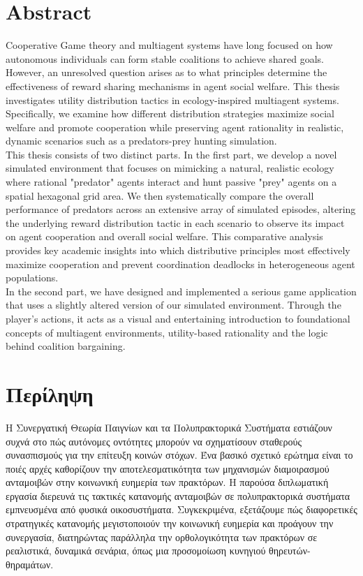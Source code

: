 \documentclass[12pt,a4paper]{report}
\begin{document}
	\chapter*{Abstract}
	
	Cooperative Game theory and multiagent systems have long focused on how autonomous individuals can form stable coalitions to achieve shared goals. However, an unresolved question arises as to what principles determine the effectiveness of reward sharing mechanisms in agent social welfare. This thesis investigates utility distribution tactics in ecology-inspired multiagent systems. Specifically, we examine how different distribution strategies maximize social welfare and promote cooperation while preserving agent rationality in realistic, dynamic scenarios such as a predators-prey hunting simulation. \\   
	
	This thesis consists of two distinct parts. In the first part, we develop a novel simulated environment that focuses on mimicking a natural, realistic ecology where rational "predator" agents interact and hunt passive "prey" agents on a spatial hexagonal grid area. We then systematically compare the overall performance of predators across an extensive array of simulated episodes, altering the underlying reward distribution tactic in each scenario to observe its impact on agent cooperation and overall social welfare. This comparative analysis provides key academic insights into which distributive principles most effectively maximize cooperation and prevent coordination deadlocks in heterogeneous agent populations. \\
	
	In the second part, we have designed and implemented a serious game application that uses a slightly altered version of our simulated environment. Through the player's actions, it acts as a visual and entertaining introduction to foundational concepts of multiagent environments, utility-based rationality and the logic behind coalition bargaining. \\
	
	\chapter*{Περίληψη}
	Η Συνεργατική Θεωρία Παιγνίων και τα Πολυπρακτορικά Συστήματα εστιάζουν συχνά στο πώς αυτόνομες οντότητες μπορούν να σχηματίσουν σταθερούς συνασπισμούς για την επίτευξη κοινών στόχων. Ένα βασικό σχετικό ερώτημα είναι το ποιές αρχές καθορίζουν την αποτελεσματικότητα των μηχανισμών διαμοιρασμού ανταμοιβών στην κοινωνική ευημερία των πρακτόρων. Η παρούσα διπλωματική εργασία διερευνά τις τακτικές κατανομής ανταμοιβών σε πολυπρακτορικά συστήματα εμπνευσμένα από φυσικά οικοσυστήματα. Συγκεκριμένα, εξετάζουμε πώς διαφορετικές στρατηγικές κατανομής μεγιστοποιούν την κοινωνική ευημερία και προάγουν την συνεργασία, διατηρώντας παράλληλα την ορθολογικότητα των πρακτόρων σε ρεαλιστικά, δυναμικά σενάρια, όπως μια προσομοίωση κυνηγιού θηρευτών-θηραμάτων. \\
	
\end{document}
